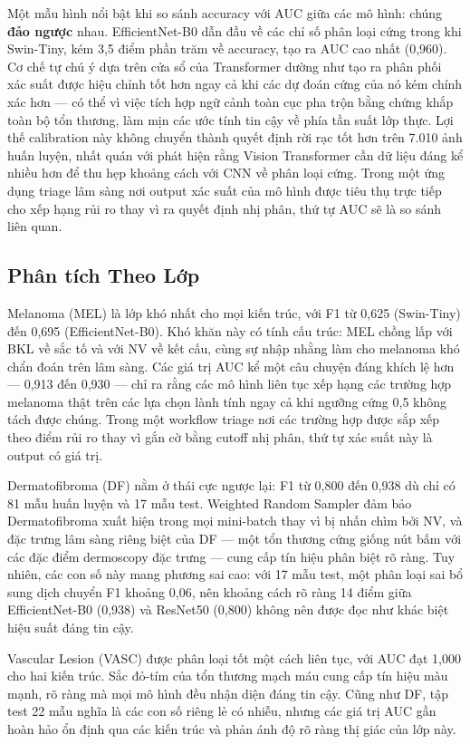 Một mẫu hình nổi bật khi so sánh accuracy với AUC giữa các mô hình: chúng \textbf{đảo ngược} nhau. EfficientNet-B0 dẫn đầu về các chỉ số phân loại cứng trong khi Swin-Tiny, kém 3,5 điểm phần trăm về accuracy, tạo ra AUC cao nhất (0,960). Cơ chế tự chú ý dựa trên cửa sổ của Transformer dường như tạo ra phân phối xác suất được hiệu chỉnh tốt hơn ngay cả khi các dự đoán cứng của nó kém chính xác hơn --- có thể vì việc tích hợp ngữ cảnh toàn cục pha trộn bằng chứng khắp toàn bộ tổn thương, làm mịn các ước tính tin cậy về phía tần suất lớp thực. Lợi thế calibration này không chuyển thành quyết định rời rạc tốt hơn trên 7.010 ảnh huấn luyện, nhất quán với phát hiện rằng Vision Transformer cần dữ liệu đáng kể nhiều hơn để thu hẹp khoảng cách với CNN về phân loại cứng. Trong một ứng dụng triage lâm sàng nơi output xác suất của mô hình được tiêu thụ trực tiếp cho xếp hạng rủi ro thay vì ra quyết định nhị phân, thứ tự AUC sẽ là so sánh liên quan.

\subsection{Phân tích Theo Lớp}

Melanoma (MEL) là lớp khó nhất cho mọi kiến trúc, với F1 từ 0,625 (Swin-Tiny) đến 0,695 (EfficientNet-B0). Khó khăn này có tính cấu trúc: MEL chồng lấp với BKL về sắc tố và với NV về kết cấu, cùng sự nhập nhằng làm cho melanoma khó chẩn đoán trên lâm sàng. Các giá trị AUC kể một câu chuyện đáng khích lệ hơn --- 0,913 đến 0,930 --- chỉ ra rằng các mô hình liên tục xếp hạng các trường hợp melanoma thật trên các lựa chọn lành tính ngay cả khi ngưỡng cứng 0,5 không tách được chúng. Trong một workflow triage nơi các trường hợp được sắp xếp theo điểm rủi ro thay vì gắn cờ bằng cutoff nhị phân, thứ tự xác suất này là output có giá trị.

Dermatofibroma (DF) nằm ở thái cực ngược lại: F1 từ 0,800 đến 0,938 dù chỉ có 81 mẫu huấn luyện và 17 mẫu test. Weighted Random Sampler đảm bảo Dermatofibroma xuất hiện trong mọi mini-batch thay vì bị nhấn chìm bởi NV, và đặc trưng lâm sàng riêng biệt của DF --- một tổn thương cứng giống nút bấm với các đặc điểm dermoscopy đặc trưng --- cung cấp tín hiệu phân biệt rõ ràng. Tuy nhiên, các con số này mang phương sai cao: với 17 mẫu test, một phân loại sai bổ sung dịch chuyển F1 khoảng 0,06, nên khoảng cách rõ ràng 14 điểm giữa EfficientNet-B0 (0,938) và ResNet50 (0,800) không nên được đọc như khác biệt hiệu suất đáng tin cậy.

Vascular Lesion (VASC) được phân loại tốt một cách liên tục, với AUC đạt 1,000 cho hai kiến trúc. Sắc đỏ-tím của tổn thương mạch máu cung cấp tín hiệu màu mạnh, rõ ràng mà mọi mô hình đều nhận diện đáng tin cậy. Cũng như DF, tập test 22 mẫu nghĩa là các con số riêng lẻ có nhiễu, nhưng các giá trị AUC gần hoàn hảo ổn định qua các kiến trúc và phản ánh độ rõ ràng thị giác của lớp này.

